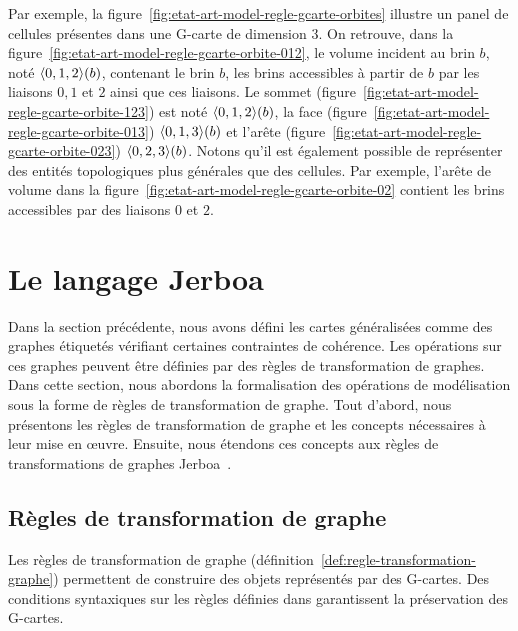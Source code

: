 Par exemple, la figure~\ref{fig:etat-art-model-regle-gcarte-orbites} illustre un
panel de cellules présentes dans une G-carte de dimension $3$. %
On retrouve, dans la figure~\ref{fig:etat-art-model-regle-gcarte-orbite-012}, le
volume incident au brin $b$, noté $\langle0,1,2\rangle(b)$, contenant le brin $b$, les
brins accessibles à partir de $b$ par les liaisons $0,1$ et $2$ ainsi que ces
liaisons. %
Le sommet (figure~\ref{fig:etat-art-model-regle-gcarte-orbite-123}) est noté
$\langle0,1,2\rangle(b)$, la face
(figure~\ref{fig:etat-art-model-regle-gcarte-orbite-013}) $\langle0,1,3\rangle(b)$ et
l'arête (figure~\ref{fig:etat-art-model-regle-gcarte-orbite-023})
$\langle0,2,3\rangle(b)$. %
Notons qu'il est également possible de représenter des entités topologiques plus
générales que des cellules. Par exemple, l'arête de volume dans la
figure~\ref{fig:etat-art-model-regle-gcarte-orbite-02} contient les brins
accessibles par des liaisons $0$ et $2$. %



\section[Le langage Jerboa]{Le langage Jerboa}
\label{sec:etat-art-model-regles-lang-jerboa}



Dans la section précédente, nous avons défini les
cartes généralisées comme des graphes étiquetés vérifiant certaines
contraintes de cohérence. %
Les opérations sur ces graphes peuvent être définies par des règles de
transformation de graphes. %
Dans cette section, nous abordons la formalisation des opérations de modélisation sous la forme de règles de transformation de graphe. %
Tout d'abord, nous présentons les règles de transformation de graphe et les
concepts nécessaires à leur mise en \oe uvre. %
Ensuite, nous étendons ces concepts aux règles de transformations de graphes
Jerboa~\cite{belhaouari2014jerboa,arnould2022preserving,pascual2022topological}. %

\subsection[Règles de transformation de graphe]{Règles de transformation de graphe}
\label{sec:etat-art-model-regles-lang-jerboa-regles-inst}


Les règles de transformation de graphe (définition~\ref{def:regle-transformation-graphe})
permettent de construire des objets représentés par des G-cartes.
Des conditions syntaxiques sur les règles définies dans
\cite{poudr2009,pascual2022topological} garantissent la préservation
des G-cartes. %

